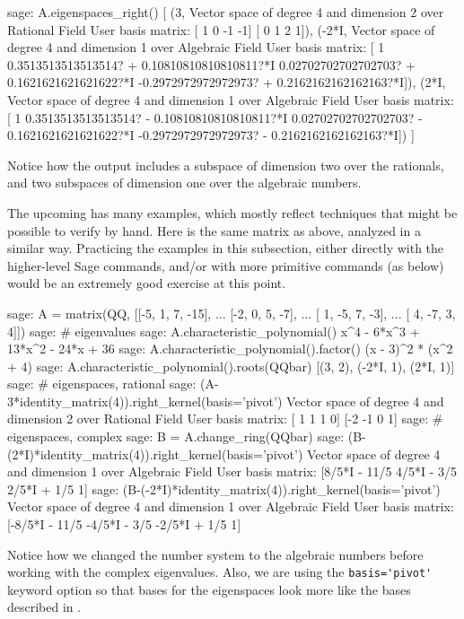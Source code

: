 %
\begin{sageexample}
sage: A.eigenspaces_right()
[
(3, Vector space of degree 4 and dimension 2 over Rational Field
User basis matrix:
[ 1  0 -1 -1]
[ 0  1  2  1]),
(-2*I, Vector space of degree 4 and dimension 1 over Algebraic Field
User basis matrix:
[                                           1
 0.3513513513513514?  + 0.10810810810810811?*I
 0.02702702702702703? +  0.1621621621621622?*I
 -0.2972972972972973? +  0.2162162162162163?*I]),
(2*I, Vector space of degree 4 and dimension 1 over Algebraic Field
User basis matrix:
[                                           1
 0.3513513513513514?  - 0.10810810810810811?*I
 0.02702702702702703? -  0.1621621621621622?*I
-0.2972972972972973?  -  0.2162162162162163?*I])
]
\end{sageexample}
%
Notice how the output includes a subspace of dimension two over the rationals, and two subspaces of dimension one over the algebraic numbers.\par
%
The upcoming  has many examples, which mostly reflect techniques that might be possible to verify by hand.  Here is the same matrix as above, analyzed in a similar way.  Practicing the examples in this subsection, either directly with the higher-level Sage commands, and/or with more primitive commands (as below) would be an extremely  good exercise at this point.
%
\begin{sageexample}
sage: A = matrix(QQ, [[-5,  1, 7, -15],
...                   [-2,  0, 5, -7],
...                   [ 1, -5, 7, -3],
...                   [ 4, -7, 3, 4]])
sage: # eigenvalues
sage: A.characteristic_polynomial()
x^4 - 6*x^3 + 13*x^2 - 24*x + 36
sage: A.characteristic_polynomial().factor()
(x - 3)^2 * (x^2 + 4)
sage: A.characteristic_polynomial().roots(QQbar)
[(3, 2), (-2*I, 1), (2*I, 1)]
sage: # eigenspaces, rational
sage: (A-3*identity_matrix(4)).right_kernel(basis='pivot')
Vector space of degree 4 and dimension 2 over Rational Field
User basis matrix:
[ 1  1  1  0]
[-2 -1  0  1]
sage: # eigenspaces, complex
sage: B = A.change_ring(QQbar)
sage: (B-(2*I)*identity_matrix(4)).right_kernel(basis='pivot')
Vector space of degree 4 and dimension 1 over Algebraic Field
User basis matrix:
[8/5*I - 11/5  4/5*I - 3/5  2/5*I + 1/5            1]
sage: (B-(-2*I)*identity_matrix(4)).right_kernel(basis='pivot')
Vector space of degree 4 and dimension 1 over Algebraic Field
User basis matrix:
[-8/5*I - 11/5  -4/5*I - 3/5  -2/5*I + 1/5             1]
\end{sageexample}
%
Notice how we changed the number system to the algebraic numbers before working with the complex eigenvalues.  Also, we are using the \verb!basis='pivot'! keyword option so that bases for the eigenspaces look more like the bases described in .\par
